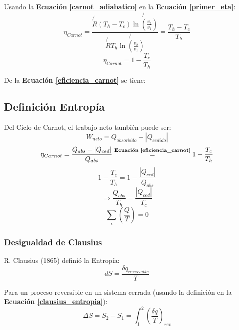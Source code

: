         Usando la \textbf{Ecuación \ref{carnot_adiabatico}} en la \textbf{Ecuación \ref{primer_eta}}:
        \[\eta_{Carnot}=\frac{\not{R}(T_{h}-T_{c}) \not{\ln(\frac{v_{2}}{v_{1}})}}{\not{R}T_{h}\not{\ln(\frac{v_{2}}{v_{1}})}}=\frac{T_{h}-T_{c}}{T_{h}}\]
        \begin{equation}
        \label{eficiencia_carnot}
            \eta_{Carnot}=1-\frac{T_{c}}{T_{h}}
        \end{equation}
        
        De la \textbf{Ecuación \ref{eficiencia_carnot}} se tiene:
        
        \begin{quote}
            \textit{}
        \end{quote}
        
    \subsection{Definición Entropía}
    
    Del Ciclo de Carnot, el trabajo neto también puede ser:
    \[W_{neto}=Q_{absorbido}-|Q_{cedido}|\]
    \[\eta_{Carnot}=\frac{Q_{abs}-|Q_{ced}|}{Q_{abs}}\overset{\text{\textbf{Ecuación \ref{eficiencia_carnot}}}}{=}1-\frac{T_{c}}{T_{h}}\]
    \[1-\frac{T_{c}}{T_{h}}=1-\frac{|Q_{ced}|}{Q_{abs}}\]
    \[\Rightarrow \frac{Q_{abs}}{T_{h}}=\frac{|Q_{ced}|}{T_{c}}\]
    \begin{equation}
    \label{entropia_carnot}
        \sum_{i} \left ( \frac{Q}{T} \right ) = 0
    \end{equation}
    
        \subsubsection{Desigualdad de Clausius}
        
        R. Clausius (1865) definió la Entropía:
        \begin{equation}
        \label{clausius_entropia}
            dS=\frac{\delta q_{reversible}}{T}
        \end{equation}
        
        Para un proceso reversible en un sistema cerrada (usando la definición en la \textbf{Ecuación \ref{clausius_entropia}}):
        \begin{equation}
        \label{definicion_entropia}
            \Delta S=S_{2}-S_{1}=\int_{1}^{2} \left ( \frac{\delta q}{T} \right )_{rev}
        \end{equation}
        
